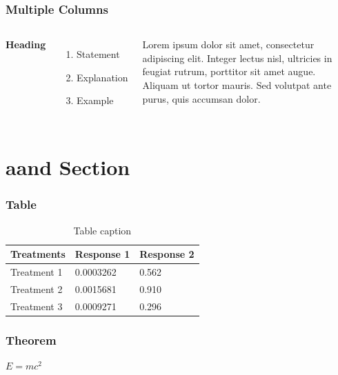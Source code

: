 \documentclass{beamer}
\begin{document}
\begin{frame}
\frametitle{Multiple Columns}
\begin{columns}[c] %

\textbf{Heading}
\begin{enumerate}
\item Statement
\item Explanation
\item Example
\end{enumerate}

Lorem ipsum dolor sit amet, consectetur adipiscing elit. Integer lectus nisl, ultricies in feugiat rutrum, porttitor sit amet augue. Aliquam ut tortor mauris. Sed volutpat ante purus, quis accumsan dolor.

\end{columns}
\end{frame}

\section{aand Section}

\begin{frame}
	\frametitle{Table}
	\begin{table}
		\begin{tabular}{l l l}
			\toprule
			\textbf{Treatments} & \textbf{Response 1} & \textbf{Response 2}\\
			\midrule
			Treatment 1 & 0.0003262 & 0.562 \\
			Treatment 2 & 0.0015681 & 0.910 \\
			Treatment 3 & 0.0009271 & 0.296 \\
			\bottomrule
		\end{tabular}
		\caption{Table caption}
	\end{table}
\end{frame}


\begin{frame}
\frametitle{Theorem}
\begin{theorem}
$E = mc^2$
\end{theorem}
\end{frame}
\end{document}
